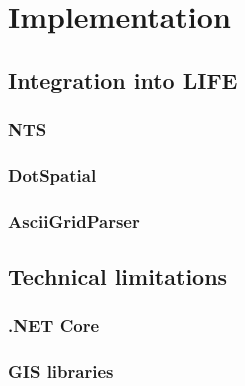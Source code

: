
\chapter{Implementation}



\section{Integration into LIFE}


\subsection{NTS}


\subsection{DotSpatial}


\subsection{AsciiGridParser}


\section{Technical limitations}


\subsection{.NET Core}


\subsection{GIS libraries}
